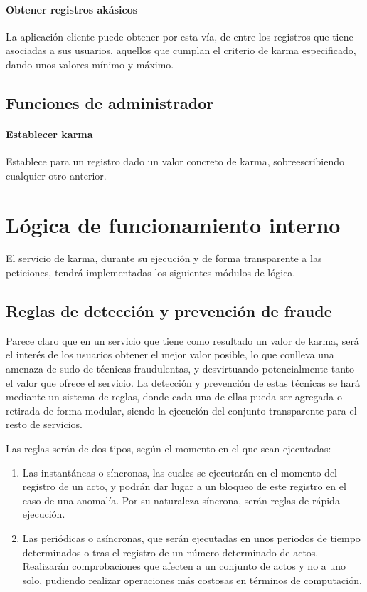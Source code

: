\documentclass[main]{subfiles}
\begin{document}
\paragraph{Obtener registros akásicos}
La aplicación cliente puede obtener por esta vía, de entre los registros que tiene asociadas a sus usuarios, aquellos que cumplan el criterio de karma especificado, dando unos valores mínimo y máximo.

\subsection{Funciones de administrador}

\paragraph{Establecer karma}
Establece para un registro dado un valor concreto de karma, sobreescribiendo cualquier otro anterior.

\section{Lógica de funcionamiento interno}

El servicio de karma, durante su ejecución y de forma transparente a las peticiones, tendrá implementadas los siguientes módulos de lógica.

\subsection{Reglas de detección y prevención de fraude}
Parece claro que en un servicio que tiene como resultado un valor de karma, será el interés de los usuarios obtener el mejor valor posible, lo que conlleva una amenaza de sudo de técnicas fraudulentas, y desvirtuando potencialmente tanto el valor que ofrece el servicio. La detección y prevención de estas técnicas se hará mediante un sistema de reglas, donde cada una de ellas pueda ser agregada o retirada de forma modular, siendo la ejecución del conjunto transparente para el resto de servicios.

Las reglas serán de dos tipos, según el momento en el que sean ejecutadas:
\begin{enumerate}
  \item Las instantáneas o síncronas, las cuales se ejecutarán en el momento del registro de un acto, y podrán dar lugar a un bloqueo de este registro en el caso de una anomalía. Por su naturaleza síncrona, serán reglas de rápida ejecución.
  \item Las periódicas o asíncronas, que serán ejecutadas en unos periodos de tiempo determinados o tras el registro de un número determinado de actos. Realizarán comprobaciones que afecten a un conjunto de actos y no a uno solo, pudiendo realizar operaciones más costosas en términos de computación.
\end{enumerate}
\end{document}
